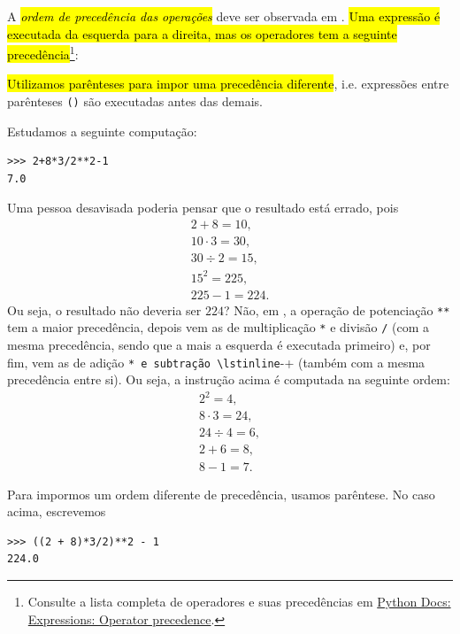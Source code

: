 A \hl{\emph{ordem de precedência das operações}} deve ser observada em {\python}. \hl{Uma expressão é executada da esquerda para a direita, mas os operadores tem a seguinte precedência}\footnote{Consulte a lista completa de operadores e suas precedências em \href{https://docs.python.org/3/reference/expressions.html\#operator-precedence}{Python Docs: Expressions: Operator precedence}.}:
\hl{Utilizamos parênteses para impor uma precedência diferente}, i.e. expressões entre parênteses \lstinline+()+ são executadas antes das demais.

\begin{ex}
  Estudamos a seguinte computação:
\begin{lstlisting}
>>> 2+8*3/2**2-1
7.0
\end{lstlisting}

  Uma pessoa desavisada poderia pensar que o resultado está errado, pois
  \begin{gather}
    2+8 = 10,\\
    10 \cdot 3 = 30,\\
    30 \div 2 = 15,\\
    15^2 = 225,\\
    225 - 1 = 224.
  \end{gather}
  Ou seja, o resultado não deveria ser $224$? Não, em {\python}, a operação de potenciação \lstinline+**+ tem a maior precedência, depois vem as de multiplicação \lstinline+*+ e divisão \lstinline+/+ (com a mesma precedência, sendo que a mais a esquerda é executada primeiro) e, por fim, vem as de adição \lstinline*+* e subtração \lstinline+-+ (também com a mesma precedência entre si). Ou seja, a instrução acima é computada na seguinte ordem:
  \begin{gather}
    2^2 = 4,\\
    8\cdot 3 = 24,\\
    24\div 4 = 6,\\
    2 + 6 = 8,\\
    8 - 1 = 7.
  \end{gather}

  Para impormos um ordem diferente de precedência, usamos parêntese. No caso acima, escrevemos
\begin{lstlisting}
>>> ((2 + 8)*3/2)**2 - 1
224.0
\end{lstlisting}
\end{ex}

